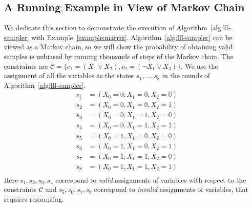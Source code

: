 \documentclass[letterpaper]{article} %
\begin{document}
\subsection{{A Running Example in View of Markov Chain}}
{We dedicate this section to demonstrate the execution of Algorithm~\ref{alg:lll-sampler} with Example~\ref{example:matrix}. Algorithm~\ref{alg:lll-sampler} can be viewed as a Markov chain, so  we will show the probability of obtaining valid samples is unbiased by running thousands of steps of the Markov chain. }
The constraints are $\mathcal{C}=\{c_1=(X_1\vee X_2), c_2=(\neg X_1 \vee X_3)\}$. We use the assignment of all the variables as the states $s_1,\ldots, s_8$ in the rounds of Algorithm~\ref{alg:lll-sampler}.
\begin{equation}
\begin{aligned}
s_1&=(X_0=0,X_1=0,X_2=0) \\
s_2&=(X_0=0,X_1=0,X_2=1) \\
s_3&=(X_0=0,X_1=1,X_2=0) \\
s_4&=(X_0=0,X_1=1,X_2=1) \\
s_5&=(X_0=1,X_1=0,X_2=0) \\
s_6&=(X_0=1,X_1=0,X_2=1) \\
s_7&=(X_0=1,X_1=1,X_2=0) \\
s_8&=(X_0=1,X_1=1,X_2=1) \\
\end{aligned}
\end{equation}
Here $s_1,s_2,s_3,s_4$ correspond to \textit{valid} assignments of variables with respect to the constraints $\mathcal{C}$ and $s_5,s_6,s_7,s_8$ correspond to \textit{invalid} assignments of variables, that requires resampling.
\end{document}
